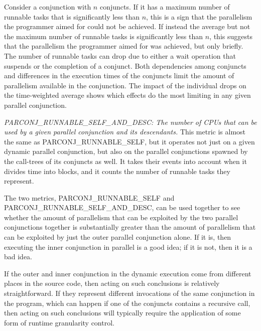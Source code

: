 Consider a conjunction with $n$ conjuncts.
If it has a maximum number of runnable tasks
that is significantly less than $n$,
this is a sign that the parallelism the programmer aimed for
could not be achieved.
If instead the average but not the maximum number of runnable tasks
is significantly less than $n$,
this suggests that the parallelism the programmer aimed for was achieved,
but only briefly.
The number of runnable tasks can drop due to
either a wait operation that suspends or the completion of a conjunct.
Both dependencies among conjuncts
and differences in the execution times of the conjuncts
limit the amount of parallelism available in the conjunction.
The impact of the individual drops on the time-weighted average
shows which effects do the most limiting in any given parallel conjunction.

\emph{PARCONJ\_RUNNABLE\_SELF\_AND\_DESC:
The number of CPUs that can be used by a given parallel conjunction
and its descendants.}
This metric is almost the same as PARCONJ\_RUNNABLE\_SELF,
but it operates
not just on a given dynamic parallel conjunction,
but also on the parallel conjunctions
spawned by the call-trees of its conjuncts as well.
It takes their events into account when it divides time into blocks,
and it counts the number of runnable tasks they represent.

The two metrics,
PARCONJ\_RUNNABLE\_SELF and PARCONJ\_RUNNABLE\_SELF\_AND\_DESC,
can be used together to see whether
the amount of parallelism that can be exploited
by the two parallel conjunctions together is substantially greater than
the amount of parallelism that can be exploited
by just the outer parallel conjunction alone.
If it is, then executing the inner conjunction in parallel is a good idea;
if it is not, then it is a bad idea.

If the outer and inner conjunction in the dynamic execution
come from different places in the source code,
then acting on such conclusions is relatively straightforward.
If they represent different invocations of the same conjunction in the program,
which can happen if one of the conjuncts contains a recursive call,
then acting on such conclusions will typically require
the application of some form of runtime granularity control.


